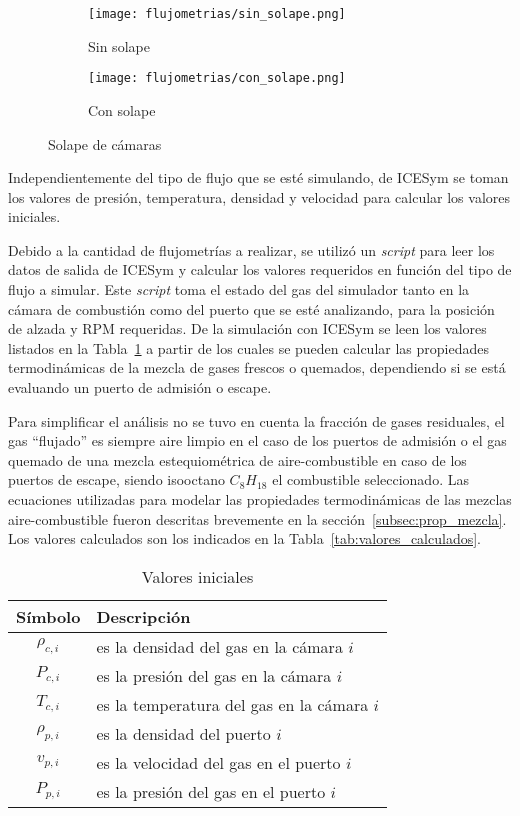 \begin{figure}[t!]
  \centering
    \begin{subfigure}[t]{0.4\textwidth}
        \centering
        \texttt{[image: flujometrias/sin\_solape.png]}
        \caption{Sin solape}
    \end{subfigure}%
    \begin{subfigure}[t]{0.4\textwidth}
        \centering
        \texttt{[image: flujometrias/con\_solape.png]}
        \caption{Con solape}
    \end{subfigure}
  \caption{Solape de cámaras}\label{fig:solape}
\end{figure}

Independientemente del tipo de flujo que se esté simulando, de ICESym se toman
los valores de presión, temperatura, densidad y velocidad para calcular los
valores iniciales.

Debido a la cantidad de flujometrías a realizar, se utilizó un \emph{script}
para leer los datos de salida de ICESym y calcular los valores requeridos en
función del tipo de flujo a simular.
%
Este \emph{script} toma el estado del gas del simulador tanto en la cámara de
combustión como del puerto que se esté analizando, para la posición de alzada y
RPM requeridas.
%
De la simulación con ICESym se leen los valores listados en la
Tabla~\ref{tab:valores_iniciales} a partir de los cuales se pueden calcular las
propiedades termodinámicas de la mezcla de gases frescos o quemados,
dependiendo si se está evaluando un puerto de admisión o escape.


Para simplificar el análisis no se tuvo en cuenta la fracción de gases
residuales, el gas ``flujado'' es siempre aire limpio en el caso de los puertos
de admisión o el gas quemado de una mezcla estequiométrica de aire-combustible
en caso de los puertos de escape, siendo isooctano $C_{8}H_{18}$ el combustible
seleccionado.
%
Las ecuaciones utilizadas para modelar las propiedades termodinámicas de las
mezclas aire-combustible fueron descritas brevemente en la
sección~\ref{subsec:prop_mezcla}.
%
Los valores calculados son los indicados en la
Tabla~\ref{tab:valores_calculados}.

\begin{table}
  \centering
  \begin{tabular}{cl}\toprule
    Símbolo & Descripción \\ \midrule
    $\rho_{c,i}$ & es la densidad del gas en la cámara $i$ \\
    $P_{c,i}$ & es la presión del gas en la cámara $i$ \\
    $T_{c,i}$ & es la temperatura del gas en la cámara $i$ \\
    $\rho_{p,i}$ & es la densidad del puerto $i$ \\
    $v_{p,i}$ & es la velocidad del gas en el puerto $i$ \\
    $P_{p,i}$ & es la presión del gas en el puerto $i$ \\ \bottomrule
  \end{tabular}
\caption{Valores iniciales}\label{tab:valores_iniciales}
\end{table}


